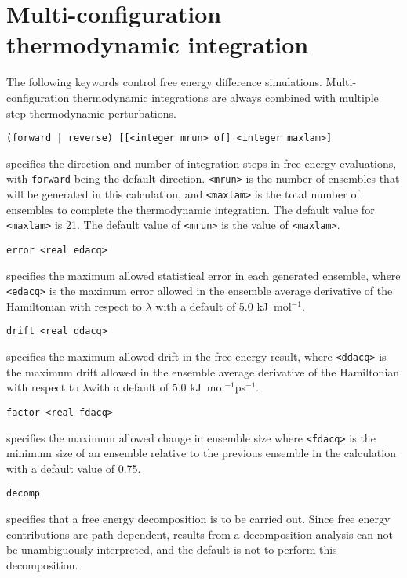 \section{Multi-configuration thermodynamic integration}
The following keywords control free energy difference simulations.
Multi-configuration thermodynamic integrations are always combined
with multiple step thermodynamic perturbations.
\begin{description}

\item
\begin{verbatim}
(forward | reverse) [[<integer mrun> of] <integer maxlam>]
\end{verbatim}
specifies the direction and number of integration steps in free
energy evaluations, with {\tt forward} being the default direction.
\verb+<mrun>+ is the number of ensembles that will be generated in
this calculation, and \verb+<maxlam>+ is the total number of ensembles
to complete the thermodynamic integration. The default value for 
\verb+<maxlam>+ is 21. The default value of \verb+<mrun>+ is the 
value of \verb+<maxlam>+.

\item
\begin{verbatim}
error <real edacq>
\end{verbatim}
specifies the maximum allowed statistical error in each generated
ensemble, where \verb+<edacq>+ is the maximum error allowed in the 
ensemble average derivative of the Hamiltonian with respect to 
$\lambda$ with a default of 5.0 kJ~mol$^{-1}$.

\item
\begin{verbatim}
drift <real ddacq>
\end{verbatim}
specifies the maximum allowed drift in the free energy result,
where \verb+<ddacq>+ is the maximum drift allowed in the
ensemble average derivative of the Hamiltonian with respect to 
$\lambda$with a default of 5.0 kJ~mol$^{-1}$ps$^{-1}$.

\item
\begin{verbatim}
factor <real fdacq>
\end{verbatim}
specifies the maximum allowed change in ensemble size
where \verb+<fdacq>+ is the minimum size of an ensemble relative to the
previous ensemble in the calculation with a default value of 0.75.

\item
\begin{verbatim}
decomp
\end{verbatim}
specifies that a free energy decomposition is to be carried out.
Since free energy contributions are path dependent, results from a
decomposition analysis can not be unambiguously interpreted, and
the default is not to perform this decomposition.


\end{description}
